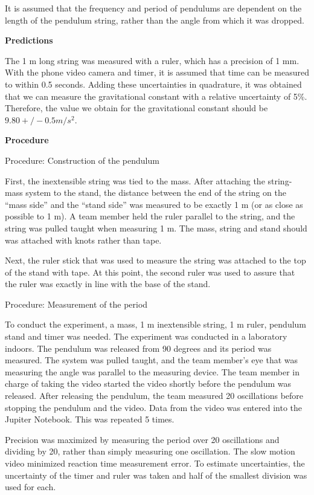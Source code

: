 It is assumed that the frequency and period of pendulums are dependent on the length of the pendulum string, rather than the angle from which it was dropped. 

\textbf{Predictions}

The 1 m long string was measured with a ruler, which has a precision of 1 mm. With the phone video camera and timer, it is assumed that time can be measured to within 0.5 seconds. Adding these uncertainties in quadrature, it was obtained that we can measure the gravitational constant with a relative uncertainty of 5\%. Therefore, the value we obtain for the gravitational constant should be $9.80 +/- 0.5 m/s^2$. 


\textbf{Procedure}

Procedure: Construction of the pendulum

First, the inextensible string was tied to the mass. After attaching the string-mass system to the stand, the distance between the end of the string on the ``mass side'' and the ``stand side'' was measured to be exactly 1 m (or as close as possible to 1 m). A team member held the ruler parallel to the string, and the string was pulled taught when measuring 1 m. The mass, string and stand should was attached with knots rather than tape.

Next, the ruler stick that was used to measure the string was attached to the top of the stand with tape. At this point, the second ruler was used to assure that the ruler was exactly in line with the base of the stand.

Procedure: Measurement of the period

To conduct the experiment, a mass, 1 m inextensible string, 1 m ruler, pendulum stand and timer was needed. The experiment was conducted in a laboratory indoors. The pendulum was released from 90 degrees and its period was measured. The system was pulled taught, and the team member's eye that was measuring the angle was parallel to the measuring device. The team member in charge of taking the video started the video shortly before the pendulum was released. After releasing the pendulum, the team measured 20 oscillations before stopping the pendulum and the video. Data from the video was entered into the Jupiter Notebook. This was repeated 5 times.

Precision was maximized by measuring the period over 20 oscillations and dividing by 20, rather than simply measuring one oscillation. The slow motion video minimized reaction time measurement error. To estimate uncertainties, the uncertainty of the timer and ruler was taken and half of the smallest division was used for each.

